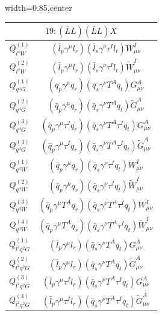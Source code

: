 
\begin{table}[H]
\begin{center}
\begin{adjustbox}{width=0.85\textwidth,center}
\small
\begin{minipage}[t]{5.6cm}
\renewcommand{\arraystretch}{1.5}
\begin{tabular}[t]{c|c}
\multicolumn{2}{c}{\boldmath$19:(\bar L L)(\bar L L)X$} \\
\hline
$Q_{l^4W}^{(1)}$  &  $(\bar l_p \gamma^\mu l_r) (\bar l_s \gamma^\nu \tau^I l_t) W_{\mu\nu}^I$ \\
%
$Q_{l^4W}^{(2)}$  &  $(\bar l_p \gamma^\mu l_r) (\bar l_s \gamma^\nu \tau^I l_t) \widetilde W_{\mu\nu}^I$ \\
%
$Q_{q^4G}^{(1)}$  & $(\bar q_p \gamma^\mu q_r) (\bar q_s \gamma^\nu T^A q_t) G^A_{\mu\nu}$ \\
%
$Q_{q^4G}^{(2)}$  & $(\bar q_p \gamma^\mu q_r) (\bar q_s \gamma^\nu T^A q_t) \widetilde G^A_{\mu\nu}$ \\
%
$Q_{q^4G}^{(3)}$  & $(\bar q_p \gamma^\mu \tau^I q_r) (\bar q_s \gamma^\nu T^A \tau^I q_t) G^A_{\mu\nu}$ \\
%
$Q_{q^4G}^{(4)}$  & $(\bar q_p \gamma^\mu \tau^I q_r) (\bar q_s \gamma^\nu T^A \tau^I q_t) \widetilde G^A_{\mu\nu}$ \\
%
$Q_{q^4W}^{(1)}$  & $(\bar q_p \gamma^\mu q_r) (\bar q_s \gamma^\nu \tau^I q_t) W^I_{\mu\nu}$ \\
%
$Q_{q^4W}^{(2)}$  & $(\bar q_p \gamma^\mu q_r) (\bar q_s \gamma^\nu \tau^I q_t) \widetilde W^I_{\mu\nu}$ \\
%
$Q_{q^4W}^{(3)}$  & $(\bar q_p \gamma^\mu T^A q_r) (\bar q_s \gamma^\nu T^A \tau^I q_t) W^I_{\mu\nu}$ \\
%
$Q_{q^4W}^{(4)}$  & $(\bar q_p \gamma^\mu T^A q_r) (\bar q_s \gamma^\nu T^A \tau^I q_t) \widetilde W^I_{\mu\nu}$ \\
%
$Q_{l^2q^2G}^{(1)}$  & $(\bar l_p \gamma^\mu l_r) (\bar q_s \gamma^\nu T^A q_t) G^A_{\mu\nu}$ \\
%
$Q_{l^2q^2G}^{(2)}$  & $(\bar l_p \gamma^\mu l_r) (\bar q_s \gamma^\nu T^A q_t) \widetilde G^A_{\mu\nu}$ \\
%
$Q_{l^2q^2G}^{(3)}$  & $(\bar l_p \gamma^\mu \tau^I l_r) (\bar q_s \gamma^\nu T^A \tau^I q_t) G^A_{\mu\nu}$ \\
%
$Q_{l^2q^2G}^{(4)}$  & $(\bar l_p \gamma^\mu \tau^I l_r) (\bar q_s \gamma^\nu T^A \tau^I q_t) \widetilde G^A_{\mu\nu}$ \\

\end{tabular}
\end{minipage}
\end{adjustbox}
\end{center}
\end{table}
